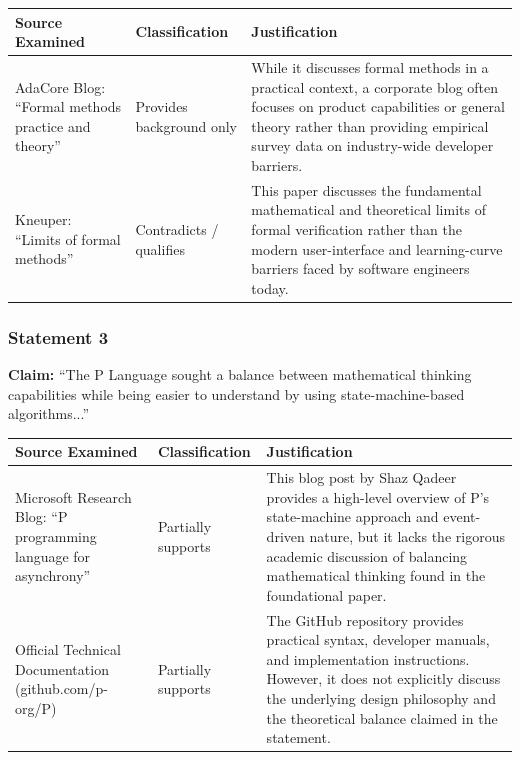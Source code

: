 \documentclass{article}
\begin{document}
\begin{table}[h!]
\centering
\renewcommand{\arraystretch}{1.5}
\begin{tabular}{|p{4.5cm}|p{3.5cm}|p{7cm}|}
\hline
\textbf{Source Examined} & \textbf{Classification} & \textbf{Justification} \\ \hline
AdaCore Blog: ``Formal methods practice and theory'' & Provides background only & While it discusses formal methods in a practical context, a corporate blog often focuses on product capabilities or general theory rather than providing empirical survey data on industry-wide developer barriers. \\ \hline
Kneuper: ``Limits of formal methods'' & Contradicts / qualifies & This paper discusses the fundamental mathematical and theoretical limits of formal verification rather than the modern user-interface and learning-curve barriers faced by software engineers today. \\ \hline
\end{tabular}
\end{table}
 \newpage
\subsubsection*{Statement 3}
\textbf{Claim:} ``The P Language sought a balance between mathematical thinking capabilities while being easier to understand by using state-machine-based algorithms...''

\begin{table}[h!]
\centering
\renewcommand{\arraystretch}{1.5}
\begin{tabular}{|p{4.5cm}|p{3.5cm}|p{7cm}|}
\hline
\textbf{Source Examined} & \textbf{Classification} & \textbf{Justification} \\ \hline
Microsoft Research Blog: ``P programming language for asynchrony'' & Partially supports & This blog post by Shaz Qadeer provides a high-level overview of P's state-machine approach and event-driven nature, but it lacks the rigorous academic discussion of balancing mathematical thinking found in the foundational paper. \\ \hline
Official Technical Documentation (github.com/p-org/P) & Partially supports & The GitHub repository provides practical syntax, developer manuals, and implementation instructions. However, it does not explicitly discuss the underlying design philosophy and the theoretical balance claimed in the statement. \\ \hline
\end{tabular}
\end{table}
\end{document}
